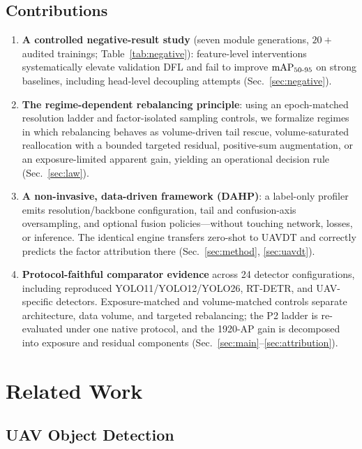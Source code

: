 \documentclass[journal]{IEEEtran}
\newcommand{\map}{\textup{mAP}}
\newcommand{\ap}{\textup{AP}}
\newcommand{\uavdt}{UAVDT}
\begin{document}
\subsection{Contributions}
\begin{enumerate}
\item \textbf{A controlled negative-result study} (seven module generations, $20+$ audited trainings; Table~\ref{tab:negative}): feature-level interventions systematically elevate validation DFL and fail to improve $\map_{50\text{-}95}$ on strong baselines, including head-level decoupling attempts (Sec.~\ref{sec:negative}).
\item \textbf{The regime-dependent rebalancing principle}: using an epoch-matched resolution ladder and factor-isolated sampling controls, we formalize regimes in which rebalancing behaves as volume-driven tail rescue, volume-saturated reallocation with a bounded targeted residual, positive-sum augmentation, or an exposure-limited apparent gain, yielding an operational decision rule (Sec.~\ref{sec:law}).
\item \textbf{A non-invasive, data-driven framework (DAHP)}: a label-only profiler emits resolution/backbone configuration, tail and confusion-axis oversampling, and optional fusion policies---without touching network, losses, or inference. The identical engine transfers zero-shot to \uavdt{} and correctly predicts the factor attribution there (Sec.~\ref{sec:method}, \ref{sec:uavdt}).
\item \textbf{Protocol-faithful comparator evidence} across 24 detector configurations, including reproduced YOLO11/YOLO12/YOLO26, RT-DETR, and UAV-specific detectors. Exposure-matched and volume-matched controls separate architecture, data volume, and targeted rebalancing; the P2 ladder is re-evaluated under one native protocol, and the 1920-\ap{} gain is decomposed into exposure and residual components (Sec.~\ref{sec:main}--\ref{sec:attribution}).
\end{enumerate}

\section{Related Work}
\subsection{UAV Object Detection}
\end{document}
